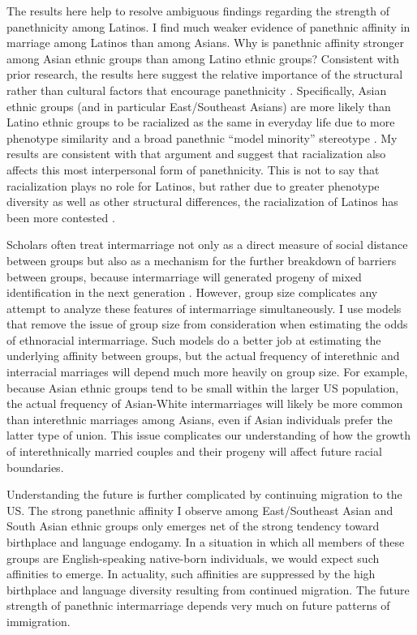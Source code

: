\documentclass[11pt,]{article}
\begin{document}
The results here help to resolve ambiguous findings regarding the strength of panethnicity among Latinos. I find much weaker evidence of panethnic affinity in marriage among Latinos than among Asians. Why is panethnic affinity stronger among Asian ethnic groups than among Latino ethnic groups? Consistent with prior research, the results here suggest the relative importance of the structural rather than cultural factors that encourage panethnicity \citep{lopez_panethnicity_1990}. Specifically, Asian ethnic groups (and in particular East/Southeast Asians) are more likely than Latino ethnic groups to be racialized as the same in everyday life due to more phenotype similarity and a broad panethnic ``model minority'' stereotype \citep{lopez_panethnicity_1990, kibria_construction_1997, rosenfeld_salience_2001}. My results are consistent with that argument and suggest that racialization also affects this most interpersonal form of panethnicity. This is not to say that racialization plays no role for Latinos, but rather due to greater phenotype diversity as well as other structural differences, the racialization of Latinos has been more contested \citep{rodriguez_changing_2000a, frank_latino_2010a, fox_defining_2013}.

Scholars often treat intermarriage not only as a direct measure of social distance between groups but also as a mechanism for the further breakdown of barriers between groups, because intermarriage will generated progeny of mixed identification in the next generation \citep{gordon_assimilation_1964}. However, group size complicates any attempt to analyze these features of intermarriage simultaneously. I use models that remove the issue of group size from consideration when estimating the odds of ethnoracial intermarriage. Such models do a better job at estimating the underlying affinity between groups, but the actual frequency of interethnic and interracial marriages will depend much more heavily on group size. For example, because Asian ethnic groups tend to be small within the larger US population, the actual frequency of Asian-White intermarriages will likely be more common than interethnic marriages among Asians, even if Asian individuals prefer the latter type of union. This issue complicates our understanding of how the growth of interethnically married couples and their progeny will affect future racial boundaries.

Understanding the future is further complicated by continuing migration to the US. The strong panethnic affinity I observe among East/Southeast Asian and South Asian ethnic groups only emerges net of the strong tendency toward birthplace and language endogamy. In a situation in which all members of these groups are English-speaking native-born individuals, we would expect such affinities to emerge. In actuality, such affinities are suppressed by the high birthplace and language diversity resulting from continued migration. The future strength of panethnic intermarriage depends very much on future patterns of immigration.



\renewcommand\refname{References}

\end{document}
